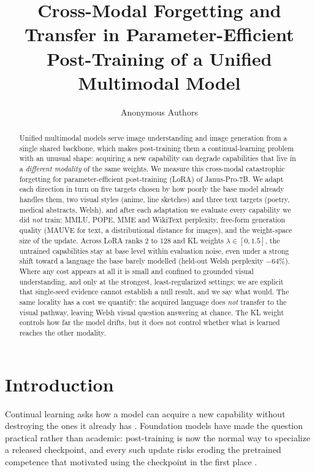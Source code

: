 \documentclass{article}
\title{Cross-Modal Forgetting and Transfer in Parameter-Efficient\\
Post-Training of a Unified Multimodal Model}
\author{%
  Anonymous Authors \\
}
\begin{document}
\maketitle

\begin{abstract}
Unified multimodal models serve image understanding and image generation from a
single shared backbone, which makes post-training them a continual-learning
problem with an unusual shape: acquiring a new capability can degrade
capabilities that live in a \emph{different modality} of the same weights. We
measure this cross-modal catastrophic forgetting for parameter-efficient
post-training (LoRA) of Janus-Pro-7B. We adapt each direction in turn on five
targets chosen by how poorly the base model already handles them, two visual
styles (anime, line sketches) and three text targets (poetry, medical abstracts,
Welsh), and after each adaptation we evaluate every capability we did \emph{not}
train: MMLU, POPE, MME and WikiText perplexity, free-form generation quality
(MAUVE for text, a distributional distance for images), and the weight-space size
of the update. Across LoRA ranks $2$ to $128$ and KL weights
$\lambda\in[0,1.5]$, the untrained capabilities stay at base level within
evaluation noise, even under a strong shift toward a language the base barely
modelled (held-out Welsh perplexity $-64\%$). Where any cost appears at all it is
small and confined to grounded visual understanding, and only at the strongest,
least-regularized settings; we are explicit that single-seed evidence cannot
establish a null result, and we say what would. The same locality has a cost we
quantify: the acquired language does \emph{not} transfer to the visual pathway,
leaving Welsh visual question answering at chance. The KL weight controls how far
the model drifts, but it does not control whether what is learned reaches the
other modality.
\end{abstract}

\section{Introduction}
Continual learning asks how a model can acquire a new capability without
destroying the ones it already has \citep{mccloskey1989catastrophic,
french1999catastrophic}. Foundation models have made the question practical
rather than academic: post-training is now the normal way to specialize a
released checkpoint, and every such update risks eroding the pretrained
competence that motivated using the checkpoint in the first place
\citep{kirkpatrick2017ewc, li2017lwf}.
\end{document}

